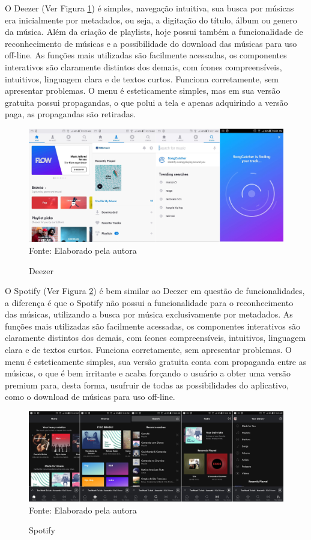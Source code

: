 O Deezer (Ver Figura \ref{fig:deezer}) é simples, navegação intuitiva, sua busca por músicas era inicialmente por metadados, ou seja, a digitação do título, álbum ou genero da música. Além da criação de playlists, hoje possui também a funcionalidade de reconhecimento de músicas e a possibilidade do download das músicas para uso off-line. As funções mais utilizadas são facilmente acessadas, os componentes interativos são claramente distintos dos demais, com ícones compreensíveis, intuitivos, linguagem clara e de textos curtos. Funciona corretamente, sem apresentar problemas. O menu é esteticamente simples, mas em sua versão gratuita possui propagandas, o que polui a tela e apenas adquirindo a versão paga, as propagandas são retiradas.

\begin{figure}[!htb]
   \centering
   \caption{Deezer}\label{fig:deezer} 
   \includegraphics[scale=0.13]{figuras/deezer.jpg}
   \\Fonte: Elaborado pela autora
\end{figure}

O Spotify (Ver Figura \ref{fig:spotify}) é bem similar ao Deezer em questão de funcionalidades, a diferença é que o Spotify não possui a funcionalidade para o reconhecimento das músicas, utilizando a busca por música exclusivamente por metadados. As funções mais utilizadas são facilmente acessadas, os componentes interativos são claramente distintos dos demais, com ícones compreensíveis, intuitivos, linguagem clara e de textos curtos. Funciona corretamente, sem apresentar problemas. O menu é esteticamente simples, sua versão gratuita conta com propaganda entre as músicas, o que é bem irritante e acaba forçando o usuário a obter uma versão premium para, desta forma, usufruir de todas as possibilidades do aplicativo, como o download de músicas para uso off-line.

\begin{figure}[!htb]
   \centering
   \caption{Spotify}\label{fig:spotify} 
   \includegraphics[scale=0.10]{figuras/spotify.jpg}
   \\Fonte: Elaborado pela autora
\end{figure}

